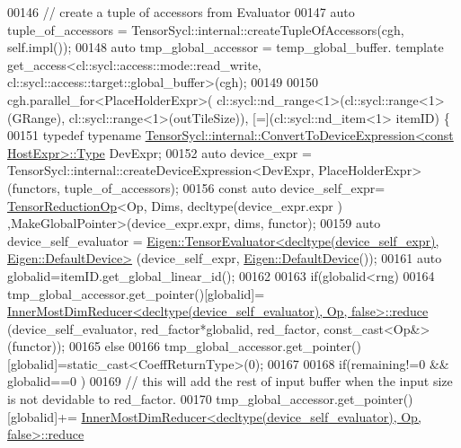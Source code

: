 \begin{DoxyCode}
00146       \textcolor{comment}{// create a tuple of accessors from Evaluator}
00147       \textcolor{keyword}{auto} tuple\_of\_accessors =  TensorSycl::internal::createTupleOfAccessors(cgh, \textcolor{keyword}{self}.impl());
00148       \textcolor{keyword}{auto} tmp\_global\_accessor = temp\_global\_buffer. \textcolor{keyword}{template} 
      get\_access<cl::sycl::access::mode::read\_write, cl::sycl::access::target::global\_buffer>(cgh);
00149 
00150       cgh.parallel\_for<PlaceHolderExpr>( cl::sycl::nd\_range<1>(cl::sycl::range<1>(GRange), 
      cl::sycl::range<1>(outTileSize)), [=](cl::sycl::nd\_item<1> itemID) \{
00151         \textcolor{keyword}{typedef} \textcolor{keyword}{typename} 
      \hyperlink{struct_eigen_1_1_tensor_sycl_1_1internal_1_1_convert_to_device_expression}{TensorSycl::internal::ConvertToDeviceExpression<const HostExpr>::Type}
       DevExpr;
00152         \textcolor{keyword}{auto} device\_expr = TensorSycl::internal::createDeviceExpression<DevExpr, PlaceHolderExpr>(functors,
       tuple\_of\_accessors);
00156         \textcolor{keyword}{const} \textcolor{keyword}{auto} device\_self\_expr= \hyperlink{class_eigen_1_1_tensor_reduction_op}{TensorReductionOp}<Op, Dims, decltype(device\_expr.expr
      ) ,MakeGlobalPointer>(device\_expr.expr, dims, functor);
00159         \textcolor{keyword}{auto} device\_self\_evaluator = 
      \hyperlink{struct_eigen_1_1_tensor_evaluator}{Eigen::TensorEvaluator<decltype(device\_self\_expr), Eigen::DefaultDevice>}
      (device\_self\_expr, \hyperlink{struct_eigen_1_1_default_device}{Eigen::DefaultDevice}());
00161         \textcolor{keyword}{auto} globalid=itemID.get\_global\_linear\_id();
00162 
00163         \textcolor{keywordflow}{if}(globalid<rng)
00164           tmp\_global\_accessor.get\_pointer()[globalid]=
      \hyperlink{struct_eigen_1_1internal_1_1_inner_most_dim_reducer}{InnerMostDimReducer<decltype(device\_self\_evaluator), Op, false>::reduce}
      (device\_self\_evaluator, red\_factor*globalid, red\_factor, \textcolor{keyword}{const\_cast<}Op&\textcolor{keyword}{>}(functor));
00165         \textcolor{keywordflow}{else}
00166           tmp\_global\_accessor.get\_pointer()[globalid]=\textcolor{keyword}{static\_cast<}CoeffReturnType\textcolor{keyword}{>}(0);
00167 
00168         \textcolor{keywordflow}{if}(remaining!=0 && globalid==0 )
00169           \textcolor{comment}{// this will add the rest of input buffer when the input size is not devidable to red\_factor.}
00170           tmp\_global\_accessor.get\_pointer()[globalid]+=
      \hyperlink{struct_eigen_1_1internal_1_1_inner_most_dim_reducer}{InnerMostDimReducer<decltype(device\_self\_evaluator), Op, false>::reduce}

\end{DoxyCode}
